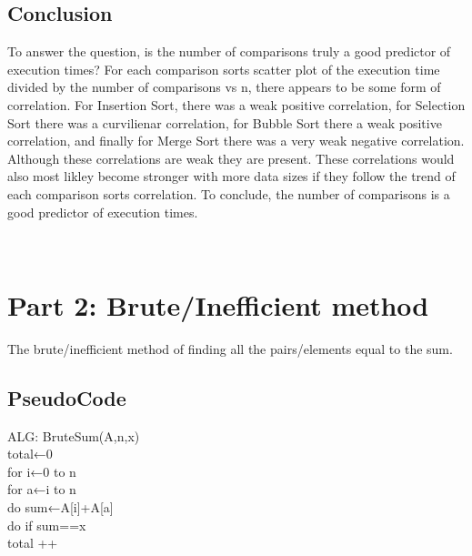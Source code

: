 \documentclass[12pt]{article}
\begin{document}
\subsection{Conclusion}

	To answer the question, is the number of comparisons truly a good predictor of execution times? For each comparison sorts scatter plot of the execution time divided by the number of comparisons vs n, there appears to be some form of correlation. For Insertion Sort, there was a weak positive correlation, for Selection Sort there was a curvilienar correlation, for Bubble Sort there a weak positive correlation, and finally for Merge Sort there was a very weak negative correlation. Although these correlations are weak they are present. These correlations would also most likley become stronger with more data sizes if they follow the trend of each comparison sorts correlation. To conclude, the number of comparisons is a good predictor of execution times.

\indent\\
	\section{Part 2: Brute/Inefficient method}
	The brute/inefficient method of finding all the pairs/elements equal to the sum.
	\subsection{PseudoCode}
	ALG: BruteSum(A,n,x) \\
	\indent \indent total←0     \\
	\indent \indent for i←0 to n \\
	\indent \indent \indent for a←i to n \\
	\indent \indent \indent \indent do sum←A[i]+A[a] \\
	\indent \indent \indent \indent do if sum==x \\
	\indent \indent \indent \indent \indent \indent total ++ \\
\end{document}
